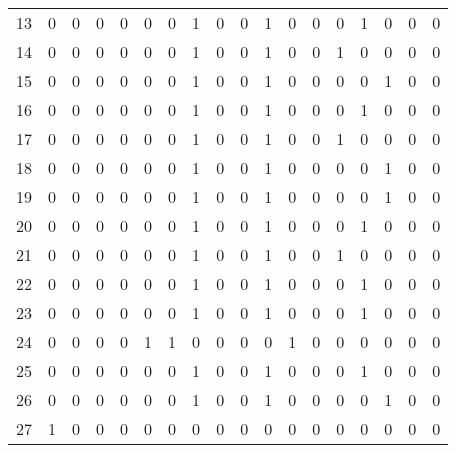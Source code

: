 \begin{tabular}{|c|c|c|c|c|c|c|c|c|c|c|c|c|c|c|c|c|c|}
13    &    0 &    0 &    0 &   0 &        0 &        0 &    1 &    0 &    0 &    1 &    0 &    0 &    0 &    1 &     0 &    0 &     0 \\
14    &    0 &    0 &    0 &   0 &        0 &        0 &    1 &    0 &    0 &    1 &    0 &    0 &    1 &    0 &     0 &    0 &     0 \\
15    &    0 &    0 &    0 &   0 &        0 &        0 &    1 &    0 &    0 &    1 &    0 &    0 &    0 &    0 &     1 &    0 &     0 \\
16    &    0 &    0 &    0 &   0 &        0 &        0 &    1 &    0 &    0 &    1 &    0 &    0 &    0 &    1 &     0 &    0 &     0 \\
17    &    0 &    0 &    0 &   0 &        0 &        0 &    1 &    0 &    0 &    1 &    0 &    0 &    1 &    0 &     0 &    0 &     0 \\
18    &    0 &    0 &    0 &   0 &        0 &        0 &    1 &    0 &    0 &    1 &    0 &    0 &    0 &    0 &     1 &    0 &     0 \\
19    &    0 &    0 &    0 &   0 &        0 &        0 &    1 &    0 &    0 &    1 &    0 &    0 &    0 &    0 &     1 &    0 &     0 \\
20    &    0 &    0 &    0 &   0 &        0 &        0 &    1 &    0 &    0 &    1 &    0 &    0 &    0 &    1 &     0 &    0 &     0 \\
21    &    0 &    0 &    0 &   0 &        0 &        0 &    1 &    0 &    0 &    1 &    0 &    0 &    1 &    0 &     0 &    0 &     0 \\
22    &    0 &    0 &    0 &   0 &        0 &        0 &    1 &    0 &    0 &    1 &    0 &    0 &    0 &    1 &     0 &    0 &     0 \\
23    &    0 &    0 &    0 &   0 &        0 &        0 &    1 &    0 &    0 &    1 &    0 &    0 &    0 &    1 &     0 &    0 &     0 \\
24    &    0 &    0 &    0 &   0 &        1 &        1 &    0 &    0 &    0 &    0 &    1 &    0 &    0 &    0 &     0 &    0 &     0 \\
25    &    0 &    0 &    0 &   0 &        0 &        0 &    1 &    0 &    0 &    1 &    0 &    0 &    0 &    1 &     0 &    0 &     0 \\
26    &    0 &    0 &    0 &   0 &        0 &        0 &    1 &    0 &    0 &    1 &    0 &    0 &    0 &    0 &     1 &    0 &     0 \\
27    &    1 &    0 &    0 &   0 &        0 &        0 &    0 &    0 &    0 &    0 &    0 &    0 &    0 &    0 &     0 &    0 &     0 \\

\end{tabular}
